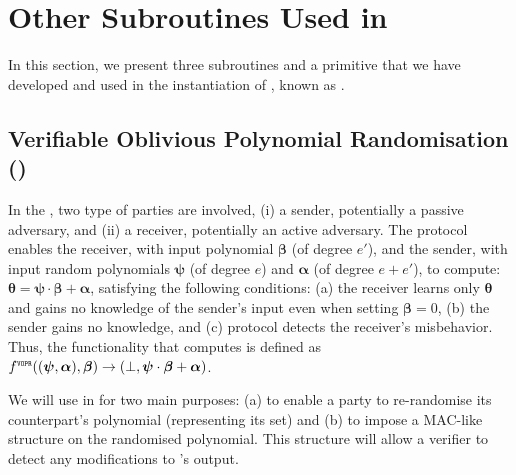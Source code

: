 

\vspace{-4.5mm}



\section{Other Subroutines Used in \withFai}\label{sec::subroutines}
\vspace{-1.4mm}

In this section, we present three subroutines and a primitive that we have developed and used in the instantiation of \p, known as \withFai. 


\vspace{-3mm}
\subsection{Verifiable Oblivious Polynomial Randomisation (\vopr)}\label{sec::vopr}
\vspace{-1.2mm}


In the \vopr, two type of parties are involved, (i) a sender, potentially a passive adversary, and (ii) a receiver, potentially an active adversary. The protocol enables the receiver, with input polynomial $\bm\beta$ (of degree $e'$), and the sender, with input random polynomials $\bm\psi$ (of degree $e$) and  $\bm{\alpha}$ (of degree $e+e'$),   to compute: $\bm\theta=\bm\psi\cdot \bm\beta+\bm\alpha$, satisfying the following conditions: (a) the receiver learns only $\bm\theta$ and gains no knowledge of the sender's input even when setting $\bm \beta=0$, (b) the sender gains no knowledge, and (c) protocol detects the receiver's misbehavior.  Thus, the functionality that  \vopr computes is defined as $f^{\scriptscriptstyle {\ensuremath{\mathtt{VOPR}}}}( (\bm\psi, \bm{\alpha}), \bm\beta)\rightarrow(\bot, \bm\psi\cdot \bm\beta+\bm\alpha)$. 

We will use {\vopr} in \withFai for two main purposes:  (a) to enable a party to re-randomise its counterpart's polynomial (representing its set) and (b) to impose a MAC-like structure on the randomised polynomial.  This structure will allow a verifier to detect any modifications to \vopr's output. 

